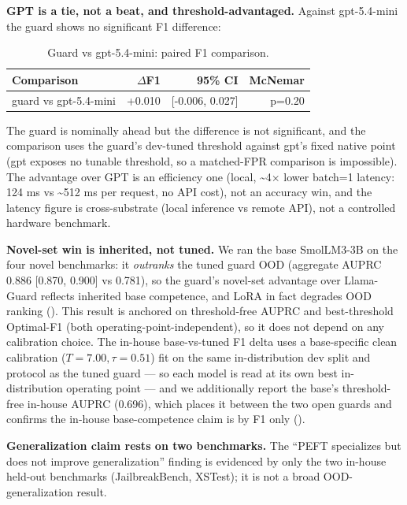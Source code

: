\documentclass[sigconf,nonacm]{acmart}
\begin{document}
\textbf{GPT is a tie, not a beat, and threshold-advantaged.} Against gpt-5.4-mini the guard shows no significant F1 difference:

\begin{table}[t]
\small
\centering
\caption{Guard vs gpt-5.4-mini: paired F1 comparison.}
\label{tab:guard-vs-gpt}
\begin{tabular}{lrrr}
\toprule
Comparison & $\Delta$F1 & 95\% CI & McNemar \\
\midrule
guard vs gpt-5.4-mini & +0.010 & [-0.006, 0.027] & p=0.20 \\
\bottomrule
\end{tabular}
\end{table}

The guard is nominally ahead but the difference is not significant, and the comparison uses the guard's dev-tuned threshold against gpt's fixed native point (gpt exposes no tunable threshold, so a matched-FPR comparison is impossible). The advantage over GPT is an efficiency one (local, \textasciitilde{}4$\times$ lower batch=1 latency: 124 ms vs \textasciitilde{}512 ms per request, no API cost), not an accuracy win, and the latency figure is cross-substrate (local inference vs remote API), not a controlled hardware benchmark.

\textbf{Novel-set win is inherited, not tuned.} We ran the base SmolLM3-3B on the four novel benchmarks: it \emph{outranks} the tuned guard OOD (aggregate AUPRC 0.886 [0.870, 0.900] vs 0.781), so the guard's novel-set advantage over Llama-Guard reflects inherited base competence, and LoRA in fact degrades OOD ranking (). This result is anchored on threshold-free AUPRC and best-threshold Optimal-F1 (both operating-point-independent), so it does not depend on any calibration choice. The in-house base-vs-tuned F1 delta uses a base-specific clean calibration ($T{=}7.00,\tau{=}0.51$) fit on the same in-distribution dev split and protocol as the tuned guard --- so each model is read at its own best in-distribution operating point --- and we additionally report the base's threshold-free in-house AUPRC (0.696), which places it between the two open guards and confirms the in-house base-competence claim is by F1 only ().

\textbf{Generalization claim rests on two benchmarks.} The ``PEFT specializes but does not improve generalization'' finding is evidenced by only the two in-house held-out benchmarks (JailbreakBench, XSTest); it is not a broad OOD-generalization result.
\end{document}

